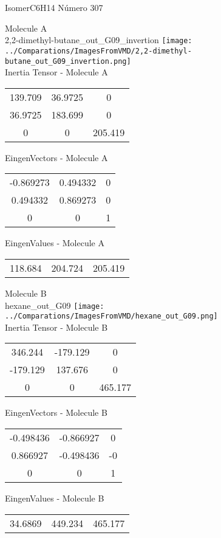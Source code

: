\vtab[-2cm]
\begin{center}
{\large IsomerC6H14 \tab Número 307}
\end{center}
\begin{multicols}{2}
\begin{center}

Molecule A \\ 
2,2-dimethyl-butane\_out\_G09\_invertion
\texttt{[image: ../Comparations/ImagesFromVMD/2,2-dimethyl-butane\_out\_G09\_invertion.png]}
\\
Inertia Tensor - Molecule A \\
\vtab

\begin{tabular}{|c c c|}
139.709	 & 	36.9725	 & 	0	 \\
36.9725	 & 	183.699	 & 	0	 \\
0	 & 	0	 & 	205.419
\end{tabular}

\vtab
 EingenVectors - Molecule A     \\
\vtab
\begin{tabular}{|c c c|}
-0.869273	 & 	0.494332	 & 	0	 \\
0.494332	 & 	0.869273	 & 	0	 \\
0	 & 	0	 & 	1
\end{tabular}

\vtab
 EingenValues - Molecule A     \\
\vtab
\begin{tabular}{|c c c|}
118.684	 & 	204.724	 & 	205.419	 \\
\end{tabular}
\columnbreak

Molecule B \\ 
hexane\_out\_G09
\texttt{[image: ../Comparations/ImagesFromVMD/hexane\_out\_G09.png]}
\\
Inertia Tensor - Molecule B \\
\vtab

\begin{tabular}{|c c c|}
346.244	 & 	-179.129	 & 	0	 \\
-179.129	 & 	137.676	 & 	0	 \\
0	 & 	0	 & 	465.177
\end{tabular}

\vtab
 EingenVectors - Molecule B     \\
\vtab
\begin{tabular}{|c c c|}
-0.498436	 & 	-0.866927	 & 	0	 \\
0.866927	 & 	-0.498436	 & 	-0	 \\
0	 & 	0	 & 	1
\end{tabular}

\vtab
 EingenValues - Molecule B     \\
\vtab
\begin{tabular}{|c c c|}
34.6869	 & 	449.234	 & 	465.177	 \\
\end{tabular}

\end{center}
\end{multicols}
